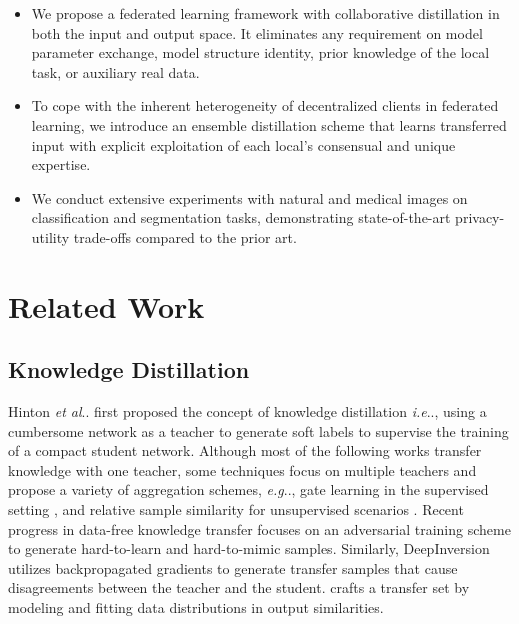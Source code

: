 \documentclass[letterpaper]{article} %
\makeatletter
\DeclareRobustCommand\onedot{\futurelet\@let@token\@onedot}
\def\@onedot{\ifx\@let@token.\else.\null\fi\xspace}
\def\eg{\emph{e.g}\onedot} \def\Eg{\emph{E.g}\onedot}
\def\ie{\emph{i.e}\onedot} \def\Ie{\emph{I.e}\onedot}
\def\etal{\emph{et al}\onedot}
\makeatother
\begin{document}
 \begin{itemize}
     \item
We propose a federated learning framework with collaborative distillation in both the input and output space. It eliminates any requirement on model parameter exchange, model structure identity, prior knowledge of the local task, or auxiliary real data. 
     \item
 To cope with the inherent heterogeneity of decentralized clients in federated learning, we introduce an ensemble distillation scheme that learns transferred input with explicit exploitation of each local's consensual and unique expertise. 
     \item
We conduct extensive experiments with natural and medical images on classification and segmentation tasks, demonstrating state-of-the-art privacy-utility trade-offs compared to the prior art.
\end{itemize}

\section{Related Work}
\label{sec:related}
\subsection{Knowledge Distillation}

Hinton \etal \cite{hinton2015distilling} first proposed the concept of knowledge distillation \ie, using a cumbersome network as a teacher to generate soft labels to supervise the training of a compact student network. %
Although most of the following works transfer knowledge with one teacher, some techniques focus on multiple teachers and propose a variety of aggregation schemes, \eg, gate learning in the supervised setting \cite{asif2019ensemble, xiang2020learning}, and relative sample similarity for unsupervised scenarios \cite{wu2019distilled}. Recent progress in data-free knowledge transfer \cite{fang2019data, chen2019data} focuses on an adversarial training scheme to generate hard-to-learn and hard-to-mimic samples. Similarly, DeepInversion \cite{yin2020dreaming} utilizes backpropagated gradients to generate transfer samples that cause disagreements between the teacher and the student. \cite{nayak2019zero} crafts a transfer set by modeling and fitting data distributions in output similarities. %
\end{document}
